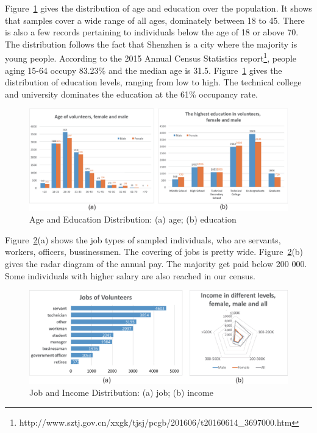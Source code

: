 Figure~\ref{fig:data_age_edu} gives the distribution of age and education over the population. It shows that samples cover a wide range of all ages, dominately between 18 to 45. There is also a few records pertaining to individuals below the age of 18 or above 70. The distribution follows the fact that Shenzhen is a city where the majority is young people. According to the 2015 Annual Census Statistics report\footnote{http://www.sztj.gov.cn/xxgk/tjsj/pcgb/201606/t20160614\_3697000.htm}, people aging 15-64 occupy 83.23\% and the median age is 31.5. Figure~\ref{fig:data_age_edu} gives the distribution of education levels, ranging from low to high. The technical college and university dominates the education at the 61\% occupancy rate. 


\begin{figure}[htb!]
 \centering %
 \includegraphics[width=\columnwidth]{pictures/data1}
 \caption{Age and Education Distribution: (a) age; (b) education}
 \label{fig:data_age_edu}
\end{figure}

Figure~\ref{fig:data_job_inc}(a) shows the job types of sampled individuals, who are servants, workers, officers, bussinessmen. The covering of jobs is pretty wide. Figure~\ref{fig:data_job_inc}(b) gives the radar diagram of the annual pay. The majority get paid below 200 000. Some individuals with higher salary are also reached in our census.

\begin{figure}[htb!]
 \centering %
 \includegraphics[width=\columnwidth]{pictures/data2}
 \caption{Job and Income Distribution: (a) job; (b) income}
 \label{fig:data_job_inc}
\end{figure}

